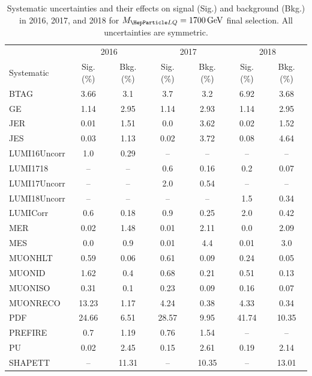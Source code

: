 \begin{table}[H]
	\begin{center}
        \begin{footnotesize}
			\caption{Systematic uncertainties and their effects on signal (Sig.) and background (Bkg.) in 2016, 2017, and 2018 for $\MLQ = \SI{1700}{GeV}$ final selection. All uncertainties are symmetric.}
			\begin{tabular}{lcccccc} \hline \hline
				& \multicolumn{2}{c}{2016} & \multicolumn{2}{c}{2017} & \multicolumn{2}{c}{2018} \\
				Systematic & Sig. (\%) & Bkg. (\%) & Sig. (\%) & Bkg. (\%) & Sig. (\%) & Bkg. (\%) \\ \hline
				BTAG &  3.66  &  3.1 &  3.7  &  3.2 &  6.92  &  3.68 \\
				GE &  1.14  &  2.95 &  1.14  &  2.93 &  1.14  &  2.95 \\
				JER &  0.01  &  1.51 &  0.0  &  3.62 &  0.02  &  1.52 \\
				JES &  0.03  &  1.13 &  0.02  &  3.72 &  0.08  &  4.64 \\
				LUMI16Uncorr &  1.0  &  0.29 & -- & -- & -- & -- \\
				LUMI1718 & -- & -- &  0.6  &  0.16 &  0.2  &  0.07 \\
				LUMI17Uncorr & -- & -- &  2.0  &  0.54 & -- & -- \\
				LUMI18Uncorr & -- & -- & -- & -- &  1.5  &  0.34 \\
				LUMICorr &  0.6  &  0.18 &  0.9  &  0.25 &  2.0  &  0.42 \\
				MER &  0.02  &  1.48 &  0.01  &  2.11 &  0.0  &  2.09 \\
				MES &  0.0  &  0.9 &  0.01  &  4.4 &  0.01  &  3.0 \\
				MUONHLT &  0.59  &  0.06 &  0.61  &  0.09 &  0.24  &  0.05 \\
				MUONID &  1.62  &  0.4 &  0.68  &  0.21 &  0.51  &  0.13 \\
				MUONISO &  0.31  &  0.1 &  0.23  &  0.09 &  0.16  &  0.07 \\
				MUONRECO &  13.23  &  1.17 &  4.24  &  0.38 &  4.33  &  0.34 \\
				PDF &  24.66  &  6.51 &  28.57  &  9.95 &  41.74  &  10.35 \\
				PREFIRE &  0.7  &  1.19 &  0.76  &  1.54 & -- & -- \\
				PU &  0.02  &  2.45 &  0.15  &  2.61 &  0.19  &  2.14 \\
				SHAPETT & -- &  11.31 & -- &  10.35 & -- &  13.01 \\

\end{tabular}
\end{footnotesize}
\end{center}
\end{table}
